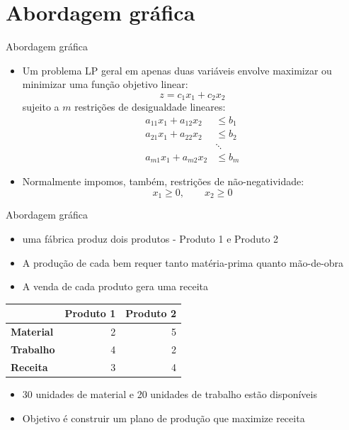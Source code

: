 \documentclass[10pt]{beamer}
\begin{document}
\section{Abordagem gráfica}
\begin{frame}{Abordagem gráfica}
    \begin{itemize}
        \item Um problema LP geral em apenas duas variáveis envolve maximizar ou minimizar uma função objetivo linear:
        \begin{equation*}
            z = c_1x_1 + c_2x_2
        \end{equation*}
        sujeito a $m$ restrições de desigualdade lineares:
        \begin{align*}
            a_{11}x_1 + a_{12}x_2 &\leq b_1\\
            a_{21}x_1 + a_{22}x_2 &\leq b_2\\
             &\ddots \\
            a_{m1}x_1 + a_{m2}x_2 &\leq b_m
        \end{align*}
        \item Normalmente impomos, também, restrições de não-negatividade:
        \[
          x_1\geq 0, \qquad x_2\geq 0  
        \]
    \end{itemize}
\end{frame}

\begin{frame}{Abordagem gráfica}
    \begin{itemize}
        \item {} uma fábrica produz dois produtos - Produto 1 e Produto 2\bigskip
        \item A produção de cada bem requer tanto matéria-prima quanto mão-de-obra\bigskip
        \item A venda de cada produto gera uma receita\bigskip        
    \end{itemize}
    \begin{table}[h]
        \centering
        \begin{tabular}{l|r|r}
        \hline
         & \textbf{Produto 1} & \textbf{Produto 2} \\
        \hline
        \hline
        \textbf{Material} & 2 & 5 \\
        \textbf{Trabalho} & 4 & 2 \\
        \textbf{Receita} & 3 & 4 \\
        \hline
        \end{tabular}
    \end{table}
    \begin{itemize}
        \item 30 unidades de material e 20 unidades de trabalho estão disponíveis\bigskip
        \item Objetivo é construir um plano de produção que maximize receita
    \end{itemize}    
\end{frame}
\end{document}
